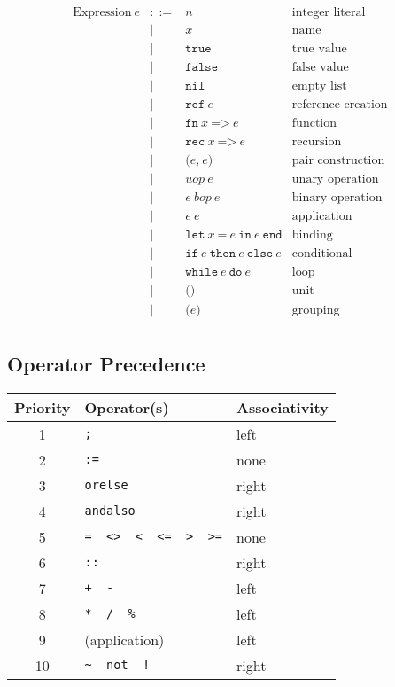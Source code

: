 \documentclass{article}
\begin{document}
\[\begin{array}{rcll}
  \mbox{Expression}\ e
    & ::= & n & \mbox{integer literal} \\
    &  |  & x & \mbox{name} \\
    &  |  & \texttt{true} & \mbox{true value} \\
    &  |  & \texttt{false} & \mbox{false value} \\
    &  |  & \texttt{nil} & \mbox{empty list} \\
    &  |  & \texttt{ref} \ e & \mbox{reference creation} \\
    &  |  & \texttt{fn} \ x \ \texttt{=>} \ e & \mbox{function} \\
    &  |  & \texttt{rec} \ x \ \texttt{=>} \ e & \mbox{recursion} \\
    &  |  & \texttt{(} e \texttt{,}\ e \texttt{)} & \mbox{pair construction} \\
    &  |  & uop\ e & \mbox{unary operation} \\
    &  |  & e\ bop\ e & \mbox{binary operation} \\
    &  |  & e\ e & \mbox{application} \\
    &  |  & \texttt{let}\ x\ \texttt{=}\ e\ \texttt{in}\ e\ \texttt{end} & \mbox{binding} \\
    &  |  & \texttt{if}\ e\ \texttt{then}\ e\ \texttt{else}\ e & \mbox{conditional} \\
    &  |  & \texttt{while}\ e\ \texttt{do}\ e & \mbox{loop} \\
    &  |  & \texttt{()} & \mbox{unit} \\
    &  |  & \texttt{(} e \texttt{)} & \mbox{grouping} \\
\end{array}\]

\subsection{Operator Precedence}

\begin{center}
\begin{tabular}{cll}
  \hline
  Priority & Operator(s) & Associativity \\
  \hline
  1 & \texttt{;} & left \\
  2 & \texttt{:=} & none \\
  3 & \texttt{orelse} & right \\
  4 & \texttt{andalso} & right \\
  5 & \texttt{= \ <> \ < \ <= \ > \ >=} & none \\
  6 & \texttt{::} & right \\
  7 & \texttt{+ \ -} & left \\
  8 & \texttt{* \ / \ \%} & left \\
  9 & (application) & left \\
  10 & \texttt{\textasciitilde\ \ not \ !} & right \\
  \hline
\end{tabular}
\end{center}
\end{document}

